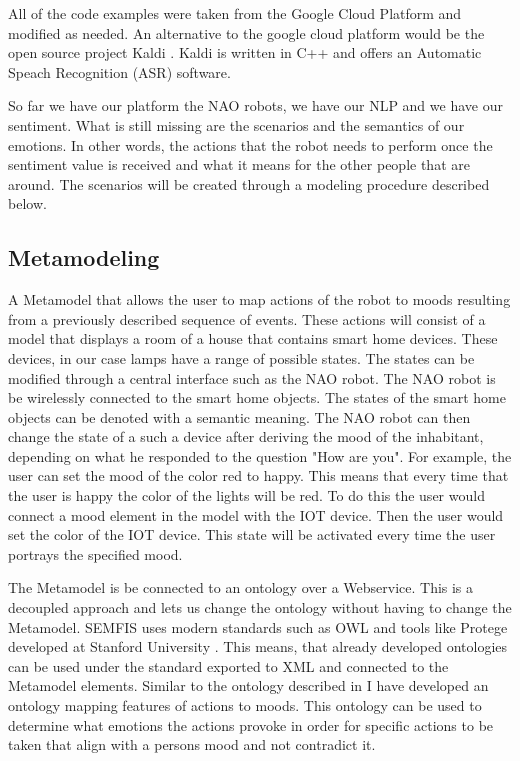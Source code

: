 \documentclass{lncs}
\begin{document}
All of the code examples were taken from the Google Cloud Platform \cite{googlecloud} and modified as needed. An alternative to the google cloud platform would be the open source project Kaldi \cite{Povey_ASRU2011}. Kaldi is written in C++ and offers an Automatic Speach Recognition (ASR) software.

So far we have our platform the NAO robots, we have our NLP and we have our sentiment. What is still missing are the scenarios and the semantics of our emotions. In other words, the actions that the robot needs to perform once the sentiment value is received and what it means for the other people that are around. The scenarios will be created through a modeling procedure described below.

\subsection{Metamodeling}

A Metamodel that allows the user to map actions of the robot to moods resulting from a previously described sequence of events. These actions will consist of a model that displays a room of a house that contains smart home devices. These devices, in our case lamps have a range of possible states. The states can be modified through a central interface such as the NAO robot. The NAO robot is be wirelessly connected to the smart home objects. The states of the smart home objects can be denoted with a semantic meaning. The NAO robot can then change the state of a such a device after deriving the mood of the inhabitant, depending on what he responded to the question "How are you". For example, the user can set the mood of the color red to happy. This means that every time that the user is happy the color of the lights will be red. To do this the user would connect a mood element in the model with the IOT device. Then the user would set the color of the IOT device. This state will be activated every time the user portrays the specified mood.

The Metamodel is be connected to an ontology over a Webservice. This is a decoupled approach and lets us change the ontology without having to change the Metamodel. SEMFIS uses modern standards such as OWL and tools like Protege developed at Stanford University \cite{cs3473}. This means, that already developed ontologies can be used under the standard exported to XML and connected to the Metamodel elements. Similar to the ontology described in \cite{borth2013large} I have developed an ontology mapping features of actions to moods. This ontology can be used to determine what emotions the actions provoke in order for specific actions to be taken that align with a persons mood and not contradict it.
\end{document}
